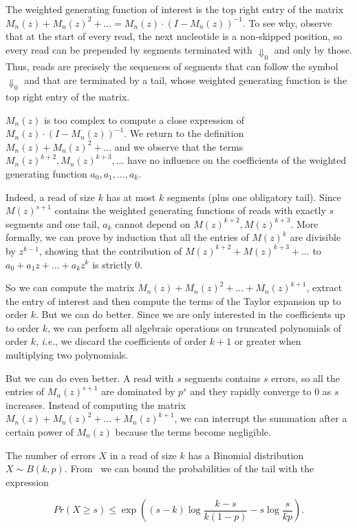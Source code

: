 \documentclass{article}
\begin{document}
The weighted generating function of interest is the top right entry of the
matrix $M_n(z) + M_n(z)^2 + \ldots = M_n(z)\cdot(I-M_n(z))^{-1}$. To see
why, observe that at the start of every read, the next nucleotide is a
non-skipped position, so every read can be prepended by segments
terminated with $\Downarrow_0$ and only by those. Thus, reads are
precisely the sequences of segments that can follow the symbol
$\Downarrow_0$ and that are terminated by a tail, whose weighted
generating function is the top right entry of the matrix.

$M_n(z)$ is too complex to compute a close expression of
$M_n(z)\cdot(I-M_n(z))^{-1}$. We return to the definition $M_n(z) +
M_n(z)^2 + \ldots$ and we observe that the terms $M_n(z)^{k+2},
M_n(z)^{k+3}, \ldots$ have no influence on the coefficients of the
weighted generating function $a_0, a_1, \ldots, a_k$.

Indeed, a read of size $k$ has at most $k$ segments (plus one obligatory
tail). Since $M(z)^{s+1}$ contains the weighted generating functions of
reads with exactly $s$ segments and one tail, $a_k$ cannot depend on
$M(z)^{k+2}, M(z)^{k+3}$. More formally, we can prove by induction that
all the entries of $M(z)^k$ are divisible by $z^{k-1}$, showing that the
contribution of $M(z)^{k+2} + M(z)^{k+3} + \ldots$ to $a_0 + a_1z + \ldots
+a_kz^k$ is strictly $0$.

So we can compute the matrix $M_n(z) + M_n(z)^2 + \ldots + M_n(z)^{k+1}$,
extract the entry of interest and then compute the terms of the Taylor
expansion up to order $k$. But we can do better. Since we are only
interested in the coefficients up to order $k$, we can perform all
algebraic operations on truncated polynomials of order $k$, \textit{i.e.},
we discard the coefficients of order $k+1$ or greater when multiplying two
polynomials.

But we can do even better. A read with $s$ segments contains $s$ errors,
so all the entries of $M_n(z)^{s+1}$ are dominated by $p^s$ and they
rapidly converge to $0$ as $s$ increases. Instead of computing the matrix
$M_n(z) + M_n(z)^2 + \ldots + M_n(z)^{k+1}$, we can interrupt the
summation after a certain power of $M_n(z)$ because the terms become
negligible.

The number of errors $X$ in a read of size $k$ has a Binomial
distribution $X \sim B(k,p)$. From~\cite{arratia1989tutorial} we can bound
the probabilities of the tail with the expression

\begin{equation}
\label{eq:bound}
Pr(X \geq s) \leq \exp \left( (s-k)\log \frac{k-s}{k(1-p)} -s\log
\frac{s}{kp} \right).
\end{equation}
\end{document}
